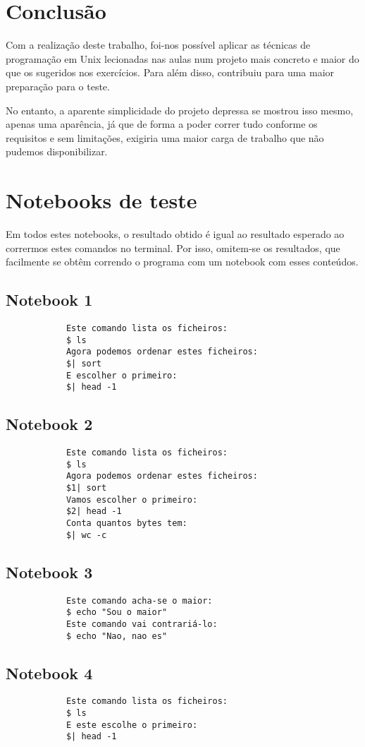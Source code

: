 \documentclass[a4paper]{article}
\begin{document}
	\section{Conclusão}
	\tab Com a realização deste trabalho, foi-nos possível aplicar as técnicas
	de programação em Unix lecionadas nas aulas num projeto mais concreto e maior
	do que os sugeridos nos exercícios. Para além disso, contribuiu para uma maior
	preparação para o teste.
	\par No entanto, a aparente simplicidade do projeto depressa se mostrou isso mesmo,
	apenas uma aparência, já que de forma a poder correr tudo conforme os requisitos
	e sem limitações, exigiria uma maior carga de trabalho que não pudemos disponibilizar.

	\section{Notebooks de teste}
		\tab Em todos estes notebooks, o resultado obtido é igual ao resultado esperado
		ao corrermos estes comandos no terminal. Por isso, omitem-se os resultados, que
		facilmente se obtêm correndo o programa com um notebook com esses conteúdos.
		\subsection{Notebook 1}
		\begin{verbatim}
			Este comando lista os ficheiros:
			$ ls
			Agora podemos ordenar estes ficheiros:
			$| sort
			E escolher o primeiro:
			$| head -1
		\end{verbatim}

		\subsection{Notebook 2}
		\begin{verbatim}
			Este comando lista os ficheiros:
			$ ls
			Agora podemos ordenar estes ficheiros:
			$1| sort
			Vamos escolher o primeiro:
			$2| head -1
			Conta quantos bytes tem:
			$| wc -c
		\end{verbatim}

		\subsection{Notebook 3}
		\begin{verbatim}
			Este comando acha-se o maior:
			$ echo "Sou o maior"
			Este comando vai contrariá-lo:
			$ echo "Nao, nao es"
		\end{verbatim}

		\subsection{Notebook 4}
		\begin{verbatim}
			Este comando lista os ficheiros:
			$ ls
			E este escolhe o primeiro:
			$| head -1
		\end{verbatim}
\end{document}
